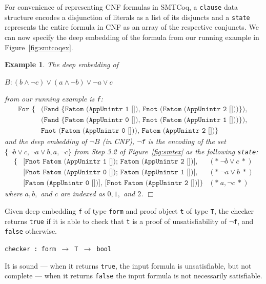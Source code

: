 \documentclass[11pt]{article}
\newtheorem{example}{Example}[section]
\newcommand{\avar}{Fatom (AppUnintr 0 [])}
\newcommand{\bvar}{Fatom (AppUnintr 1 [])}
\newcommand{\cvar}{Fatom (AppUnintr 2 [])}
\newcommand{\fnot}[1]{Fnot (#1)}
\begin{document}
	For convenience of representing 
	CNF formulas in SMTCoq, a \texttt{clause} 
	data structure encodes a disjunction of 
	literals as a list of its disjuncts
	and a \texttt{state} represents the entire 
	formula in CNF as an array of the 
	respective conjuncts. We can now 
	specify the deep embedding of the 
	formula from our running example in 
	Figure~\ref{fig:smtcoqex}.
	
	\begin{example}
		\em The deep embedding of 
		\begin{center}
			$B: (b \land \neg c) \lor 
			(a \land \neg b) \lor \neg a 
			\lor c$
		\end{center}
		from our running example is \texttt{f}:
		\begin{align*}
			\texttt{For \{}
				&\texttt{(Fand \{\bvar,\ \fnot{\cvar}\}), }\\
				&\texttt{(Fand \{\avar,\ \fnot{\bvar}\}), }\\
				&\texttt{\fnot \avar, \cvar\}}
		\end{align*}
		and the deep embedding of $\neg B$ 
		(in CNF), \texttt{$\neg$f} is the 
		encoding of the set 
		$\{\neg b \lor c, \neg a \lor b, a, 
		\neg c\}$ from Step 3.2 of 
		Figure~\ref{fig:smtex} 
		as the following \texttt{state}:
		\begin{align*}
			\{&\texttt{[Fnot Fatom 
			(AppUnintr 1 []); 
			Fatom (AppUnintr 2 [])],} 
			&(*\ \neg b \lor c\ *)\\
			&\texttt{[Fnot Fatom 
			(AppUnintr 0 []); Fatom 
			(AppUnintr 1 [])],} &(*\ 
			\neg a \lor b\ *)\\
			&\texttt{[Fatom (AppUnintr 0 
			[])], [Fnot Fatom (AppUnintr 
			2 [])]}\} &(*\ a, \neg c\ *)  
		\end{align*}
		where $a, b,$ and $c$ are indexed 
		as $0, 1,$ and $2$. \hfill $\Box$
	\end{example}

	Given deep embedding 
	\texttt{f} of type \texttt{form}
	and proof object \texttt{t} of type 
	\texttt{T}, the checker returns 
	\texttt{true} if it is able to 
	check that \texttt{t} is a proof
	of unsatisfiability of \texttt{$\neg$f},
	and \texttt{false} otherwise.
	\begin{center}
		\texttt{checker : form 
			$\to$ T $\to$ bool}	
	\end{center}
	It is sound --- when 
	it returns \texttt{true}, the
	input formula is unsatisfiable, 
	but not complete --- when it 
	returns \texttt{false} the 
	input formula is not necessarily 
	satisfiable. 
	
\end{document}
